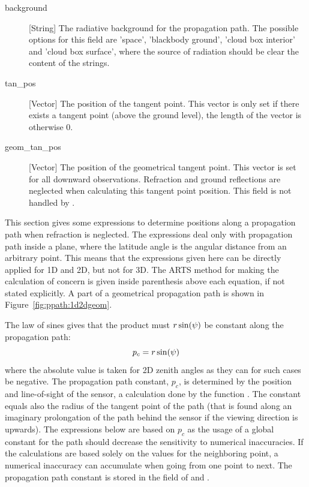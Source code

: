 \begin{description}
   \item[background] [String] The radiative background for the
     propagation path. The possible
     options for this field are 'space', 'blackbody ground', 'cloud
     box interior' and 'cloud box surface', where the source of
     radiation should be clear the content of the strings.

   \item[tan\_pos] [Vector] The position of the tangent point. This
     vector is only set if there exists a tangent point (above the
     ground level), the length of the vector is otherwise 0.
     
   \item[geom\_tan\_pos] [Vector] The position of the geometrical
     tangent point. This vector is set for all downward observations.
     Refraction and ground reflections are neglected when calculating
     this tangent point position. This field is not handled by
     .

\end{description}




\label{sec:ppath:basicgeom}

This section gives some expressions to determine positions along a
propagation path when refraction is neglected. The expressions deal
only with propagation path inside a plane, where the latitude angle is
the angular distance from an arbitrary point. This means that the
expressions given here can be directly applied for 1D and 2D, but not for
3D. The ARTS method for making the calculation of concern is given
inside parenthesis above each equation, if not stated explicitly. A
part of a geometrical propagation path is shown in
Figure~\ref{fig:ppath:1d2dgeom}.

The law of sines gives that the product must $r\sin(\psi)$ be
constant along the propagation path:
\begin{equation}
  p_c = r\sin(\psi)
  \label{eq:ppath:geomconst}
\end{equation}
where the absolute value is taken for 2D zenith angles as they can for
such cases be negative. The propagation path constant, $p_c$, is
determined by the position and line-of-sight of the sensor, a
calculation done by the function . The
constant equals also the radius of the tangent point of the path (that
is found along an imaginary prolongation of the path behind the sensor
if the viewing direction is upwards). The expressions below are based
on $p_c$ as the usage of a global constant for the path should
decrease the sensitivity to numerical inaccuracies. If the
calculations are based solely on the values for the neighboring
point, a numerical inaccuracy can accumulate when going from one point
to next. The propagation path constant is stored in the field
 of  and .

